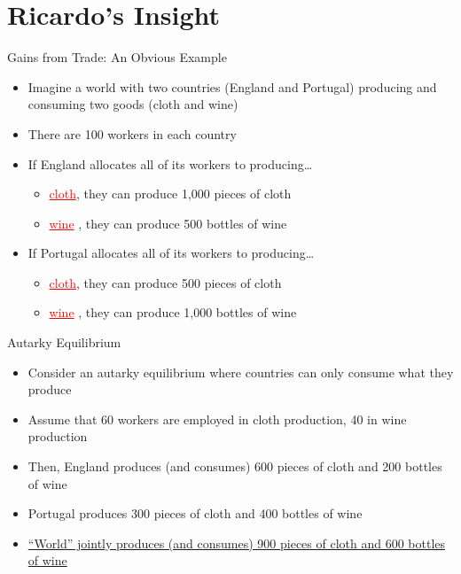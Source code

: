 \documentclass[10pt,hyperref={CJKbookmarks=true},xcolor=dvipsnames,aspectratio=169]{beamer}
\begin{document}
\section{Ricardo's Insight}
\begin{frame}{Gains from Trade: An Obvious Example}

\begin{itemize}
\item Imagine a world with two countries (England and Portugal) producing
and consuming two goods (cloth and wine) 
\item There are 100 workers in each country 
\item If England allocates all of its workers to producing… 

\begin{itemize}
\item \textcolor{red}{\uline{cloth}}, they can produce 1,000 pieces of
cloth 
\item \textcolor{red}{\uline{wine}} , they can produce 500 bottles of
wine 
\end{itemize}
\item If Portugal allocates all of its workers to producing… 

\begin{itemize}
\item \textcolor{red}{\uline{cloth}}, they can produce 500 pieces of
cloth 
\item \textcolor{red}{\uline{wine}} , they can produce 1,000 bottles
of wine 
\end{itemize}
\end{itemize}
\end{frame}

\begin{frame}{Autarky Equilibrium }

\begin{itemize}
\item Consider an autarky equilibrium where countries can only consume what
they produce 
\item Assume that 60 workers are employed in cloth production, 40 in wine
production
\item Then, England produces (and consumes) 600 pieces of cloth and 200
bottles of wine 
\item Portugal produces 300 pieces of cloth and 400 bottles of wine 
\item \uline{“World” jointly produces (and consumes) 900 pieces of cloth
and 600 bottles of wine }
\end{itemize}
\end{frame}
\end{document}
